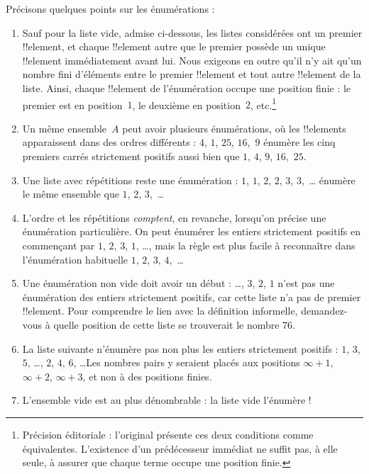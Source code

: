 \documentclass[11pt,a4paper,openany]{memoir}
\begin{document}
\begin{explain}
Précisons quelques points sur les énumérations :
\begin{enumerate}
\item Sauf pour la liste vide, admise ci-dessous, les listes considérées
  ont un premier !!{element}, et chaque !!{element} autre que le premier
  possède un unique !!{element} immédiatement avant lui. Nous exigeons
  en outre qu’il n’y ait qu’un nombre fini d’éléments entre le premier
  !!{element} et tout autre !!{element} de la liste. Ainsi, chaque
  !!{element} de l’énumération occupe une position finie : le premier
  est en position~$1$, le deuxième en position~$2$, etc.\footnote{Précision
  éditoriale : l’original présente ces deux conditions comme équivalentes.
  L’existence d’un prédécesseur immédiat ne suffit pas, à elle seule,
  à assurer que chaque terme occupe une position finie.}
\item Un même ensemble~$A$ peut avoir plusieurs énumérations, où les
  !!{element}s apparaissent dans des ordres différents : $4$, $1$,
  $25$, $16$,~$9$ énumère les cinq premiers carrés strictement positifs
  aussi bien que $1$, $4$, $9$, $16$,~$25$.
\item Une liste avec répétitions reste une énumération : $1$, $1$, $2$,
  $2$, $3$, $3$,~\dots{} énumère le même ensemble que $1$, $2$,
  $3$,~\dots
\item L’ordre et les répétitions \emph{comptent}, en revanche, lorsqu’on
  précise une énumération particulière. On peut énumérer les entiers
  strictement positifs en commençant par $1$, $2$, $3$, $1$, \dots{},
  mais la règle est plus facile à reconnaître dans l’énumération
  habituelle $1$, $2$, $3$, $4$,~\dots
\item Une énumération non vide doit avoir un début : \dots, $3$, $2$,
  $1$ n’est pas une énumération des entiers strictement positifs, car
  cette liste n’a pas de premier !!{element}. Pour comprendre le lien
  avec la définition informelle, demandez-vous à quelle position
  de cette liste se trouverait le nombre 76.
\item La liste suivante n’énumère pas non plus les entiers strictement
  positifs : $1$, $3$, $5$, \dots, $2$, $4$, $6$, \dots\@ Les nombres
  pairs y seraient placés aux positions $\infty + 1$, $\infty + 2$,
  $\infty + 3$, et non à des positions finies.
\item L’ensemble vide est au plus dénombrable : la liste vide l’énumère !
\end{enumerate}
\end{explain}
\end{document}

